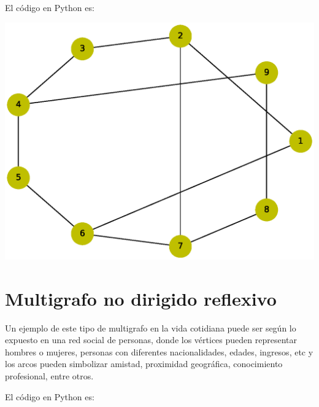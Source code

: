 \documentclass[10pt,a4paper]{article}
\begin{document}
El código en Python es:



\begin{center}

\includegraphics[scale=0.4]{MNDC}

\end{center}

\section{Multigrafo no dirigido reflexivo}

Un ejemplo de este tipo de multigrafo en la vida cotidiana puede ser según lo expuesto en \cite{art7} una red social de personas, donde los vértices pueden representar hombres o mujeres, personas con diferentes nacionalidades, edades, ingresos, etc y los arcos pueden simbolizar amistad, proximidad geográfica, conocimiento profesional, entre otros.\vspace{.4cm}

El código en Python es:


\end{document}
